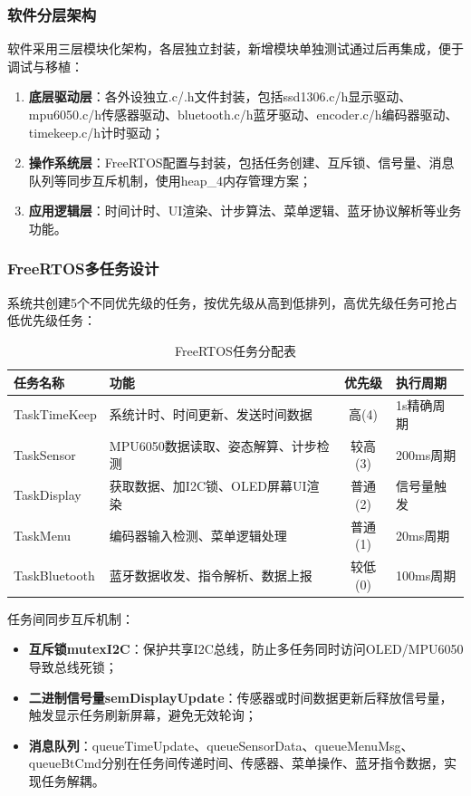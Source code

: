 \documentclass[12pt, a4paper]{ctexart}
\begin{document}
\subsubsection{软件分层架构}
软件采用三层模块化架构，各层独立封装，新增模块单独测试通过后再集成，便于调试与移植：
\begin{enumerate}
    \item \textbf{底层驱动层}：各外设独立.c/.h文件封装，包括ssd1306.c/h显示驱动、mpu6050.c/h传感器驱动、bluetooth.c/h蓝牙驱动、encoder.c/h编码器驱动、timekeep.c/h计时驱动；
    \item \textbf{操作系统层}：FreeRTOS配置与封装，包括任务创建、互斥锁、信号量、消息队列等同步互斥机制，使用heap\_4内存管理方案；
    \item \textbf{应用逻辑层}：时间计时、UI渲染、计步算法、菜单逻辑、蓝牙协议解析等业务功能。
\end{enumerate}

\subsubsection{FreeRTOS多任务设计}
系统共创建5个不同优先级的任务，按优先级从高到低排列，高优先级任务可抢占低优先级任务：
\begin{table}[htbp]
\centering
\caption{FreeRTOS任务分配表}
\label{tab:rtos_task}
\begin{tabular}{llcl}
\toprule
任务名称 & 功能 & 优先级 & 执行周期 \\
\midrule
TaskTimeKeep & 系统计时、时间更新、发送时间数据 & 高(4) & 1s精确周期 \\
TaskSensor & MPU6050数据读取、姿态解算、计步检测 & 较高(3) & 200ms周期 \\
TaskDisplay & 获取数据、加I2C锁、OLED屏幕UI渲染 & 普通(2) & 信号量触发 \\
TaskMenu & 编码器输入检测、菜单逻辑处理 & 普通(1) & 20ms周期 \\
TaskBluetooth & 蓝牙数据收发、指令解析、数据上报 & 较低(0) & 100ms周期 \\
\bottomrule
\end{tabular}
\end{table}

任务间同步互斥机制：
\begin{itemize}
    \item \textbf{互斥锁mutexI2C}：保护共享I2C总线，防止多任务同时访问OLED/MPU6050导致总线死锁；
    \item \textbf{二进制信号量semDisplayUpdate}：传感器或时间数据更新后释放信号量，触发显示任务刷新屏幕，避免无效轮询；
    \item \textbf{消息队列}：queueTimeUpdate、queueSensorData、queueMenuMsg、queueBtCmd分别在任务间传递时间、传感器、菜单操作、蓝牙指令数据，实现任务解耦。
\end{itemize}
\end{document}
